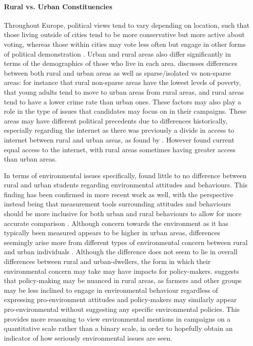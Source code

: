 \documentclass[preprint]{elsarticle} %
\begin{document}
\paragraph{Rural vs. Urban Constituencies}

Throughout Europe, political views tend to vary depending on location, such that those living outside of cities tend to be more conservative but more active about voting, whereas those within cities may vote less often but engage in other forms of political demonstration \citep{kennyUrbanruralPolarisationPolitical2021}. Urban and rural areas also differ significantly in terms of the demographics of those who live in each area. \citet{patemanRuralUrbanAreas2011} discusses differences between both rural and urban areas as well as sparse/isolated vs non-sparse areas: for instance that rural non-sparse areas have the lowest levels of poverty, that young adults tend to move to urban areas from rural areas, and rural areas tend to have a lower crime rate than urban ones. These factors may also play a role in the type of issues that candidates may focus on in their campaigns. These areas may have different political precedents due to differences historically, especially regarding the internet as there was previously a divide in access to internet between rural and urban areas, as found by \citet{choudrieRealisingGovernmentUK2005}. However \citet{patemanRuralUrbanAreas2011} found current equal access to the internet, with rural areas sometimes having greater access than urban areas.

In terms of environmental issues specifically, \citet{bognerEnvironmentalPerceptionRural1997} found little to no difference between rural and urban students regarding environmental attitudes and behaviours. This finding has been confirmed in more recent work as well, with the perspective instead being that measurement tools surrounding attitudes and behaviours should be more inclusive for both urban and rural behaviours to allow for more accurate comparison \citep{huddart-kennedyRuralUrbanDifferencesEnvironmental2009}. Although concern towards the environment as it has typically been measured appears to be higher in urban areas, differences seemingly arise more from different types of environmental concern between rural and urban individuals \citep{deberenguerRuralUrbanDifferencesEnvironmental2005}. Although the difference does not seem to lie in overall differences between rural and urban-dwellers, the form in which their environmental concern may take may have impacts for policy-makers. \citet{freudenburgRuralUrbanDifferencesEnvironmental1991} suggests that policy-making may be nuanced in rural areas, as farmers and other groups may be less inclined to engage in environmental behaviour regardless of expressing pro-environment attitudes and policy-makers may similarly appear pro-environmental without suggesting any specific environmental policies. This provides more reasoning to view environmental mentions in campaigns on a quantitative scale rather than a binary scale, in order to hopefully obtain an indicator of how seriously environmental issues are seen.
\end{document}
